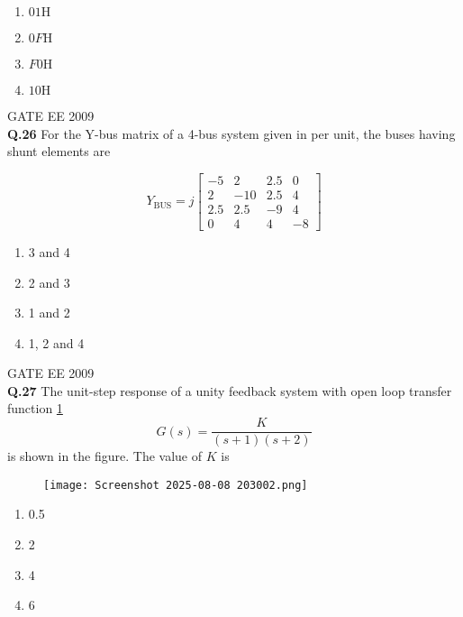 \documentclass[12pt]{article}
\begin{document}
\begin{enumerate}
    \item $01\text{H}$
    \item $0F\text{H}$
    \item $F0\text{H}$
    \item $10\text{H}$
\end{enumerate}

\vspace{0.5cm}
\hspace{10pt}
GATE EE 2009\\
\noindent\textbf{Q.26} For the Y-bus matrix of a 4-bus system given in per unit, the buses having shunt elements are

\[
Y_{\text{BUS}} = j\begin{bmatrix} 
-5 & 2 & 2.5 & 0 \\
2 & -10 & 2.5 & 4 \\
2.5 & 2.5 & -9 & 4 \\
0 & 4 & 4 & -8
\end{bmatrix}
\]

\begin{enumerate}
    \item 3 and 4
    \item 2 and 3
    \item 1 and 2
    \item 1, 2 and 4
\end{enumerate}

\vspace{0.5cm}
\hspace{10pt}
GATE EE 2009\\
\noindent\textbf{Q.27} The unit-step response of a unity feedback system with open loop transfer function \ref{fig:9}
\[
G(s) = \frac{K}{(s+1)(s+2)}
\]
is shown in the figure. The value of $K$ is
\begin{figure}[h]
    \centering
    \texttt{[image: Screenshot 2025-08-08 203002.png]}
    \label{fig:9}
\end{figure}
\begin{center}
   
\end{center}

\begin{enumerate}
    \item 0.5
    \item 2
    \item 4
    \item 6
\end{enumerate}
\end{document}
